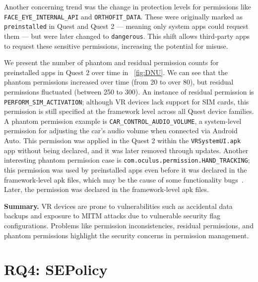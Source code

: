 \documentclass[sigconf]{acmart}
\newcommand{\bheading}[1]{{\vspace{2pt}\noindent{\textbf{#1}}}}
\newcommand{\cc}[1]{\mbox{\smaller[0.5]\texttt{#1}}}
\begin{document}
Another concerning trend was the change in protection levels for permissions like \cc{FACE\_EYE\_INTERNAL\_API} and \cc{ORTHOFIT\_DATA}. These were originally marked as \cc{preinstalled} in Quest and Quest 2 — meaning only system apps could request them — but were later changed to \cc{dangerous}.
This shift allows third-party apps to request these sensitive permissions, increasing the potential for misuse. 

\bheading{Permission inconsistencies.}
We present the number of phantom and residual permission counts for preinstalled apps in Quest 2 over time in ~\autoref{fig:DNU}.
We can see that the phantom permissions increased over time (from 20 to over 80),
but residual permissions fluctuated (between 250 to 300).
An instance of residual permission is \cc{PERFORM\_SIM\_ACTIVATION}; although VR devices lack support for SIM cards, this permission is still specified at the framework level across all Quest device families.
A phantom permission example is \cc{CAR\_CONTROL\_AUDIO\_VOLUME}, a system-level permission for adjusting the car's audio volume when connected via Android Auto. This permission was applied in the Quest 2 within the \cc{VRSystemUI.apk} app without being declared,  and it was later removed through updates.
Another interesting phantom permission case is \cc{com.oculus.permission.HAND\_TRACKING}; this permission was used by preinstalled apps even before it was declared in the framework-level apk files, which may be the cause of some functionality bugs~\cite{reddit2023}.
Later, the permission was declared in the framework-level apk files. 

\begin{mdframed}[
  roundcorner=5pt,   linewidth=0.8pt,   linecolor=black,   backgroundcolor=gray!10,
  innertopmargin=4pt,innerbottommargin=4pt,
  innerleftmargin=4pt,
  innerrightmargin=4pt
]
\textbf{Summary.} 
VR devices are prone to vulnerabilities such as accidental data backups and exposure to MITM attacks due to vulnerable security flag configurations. Problems like permission inconsistencies, residual permissions, and phantom permissions highlight the security concerns in permission management.
\end{mdframed}
 
\section{RQ4: SEPolicy}
\label{s:rq4}
\end{document}
